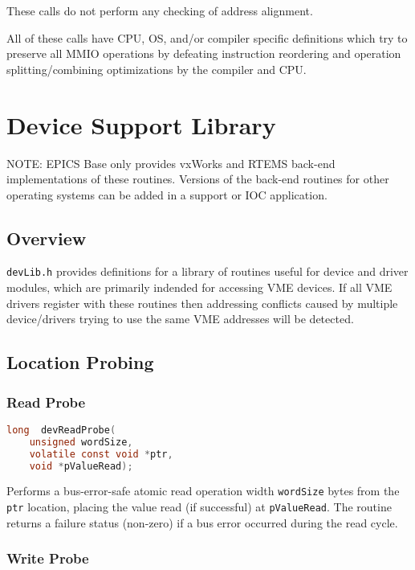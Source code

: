 These calls do not perform any checking of address alignment.

All of these calls have CPU, OS, and/or compiler specific definitions which
try to preserve all MMIO operations by defeating instruction reordering
and operation splitting/combining optimizations by the compiler and CPU.

\section{ Device Support Library}

NOTE: EPICS Base only provides vxWorks and RTEMS back-end implementations of these routines. Versions of the 
back-end routines for other operating systems can be added in a support or IOC application.

\subsection{Overview}

\verb|devLib.h| provides definitions for a library of routines useful for device and driver modules, which are primarily 
indended for accessing VME devices. If all VME drivers register with these routines  then  addressing conflicts caused by 
multiple device/drivers trying to use the same VME addresses will be detected.

\subsection{Location Probing}

\subsubsection{Read Probe}

\begin{lstlisting}[language=C]
long  devReadProbe(
    unsigned wordSize,
    volatile const void *ptr,
    void *pValueRead);
\end{lstlisting}

Performs a bus-error-safe atomic read operation width \verb|wordSize| bytes from the \verb|ptr| location, placing the value read (if 
successful) at \verb|pValueRead|. The routine returns a failure status (non-zero) if a bus error occurred during the read cycle.

\subsubsection{Write Probe}

